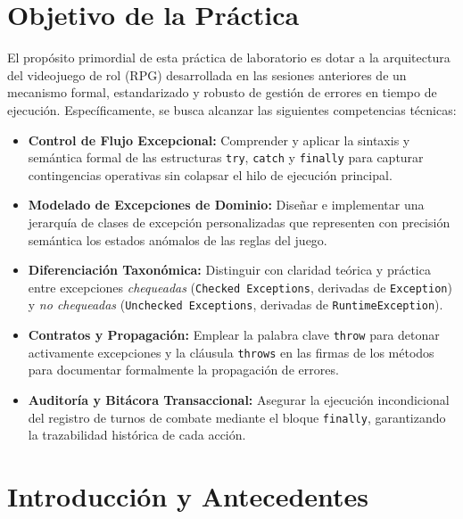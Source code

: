 \documentclass[11pt,letterpaper]{article}
\begin{document}
\section{Objetivo de la Práctica}

El propósito primordial de esta práctica de laboratorio es dotar a la arquitectura del videojuego de rol (RPG) desarrollada en las sesiones anteriores de un mecanismo formal, estandarizado y robusto de gestión de errores en tiempo de ejecución. Específicamente, se busca alcanzar las siguientes competencias técnicas:

\begin{itemize}
    \item \textbf{Control de Flujo Excepcional:} Comprender y aplicar la sintaxis y semántica formal de las estructuras \texttt{try}, \texttt{catch} y \texttt{finally} para capturar contingencias operativas sin colapsar el hilo de ejecución principal.
    \item \textbf{Modelado de Excepciones de Dominio:} Diseñar e implementar una jerarquía de clases de excepción personalizadas que representen con precisión semántica los estados anómalos de las reglas del juego.
    \item \textbf{Diferenciación Taxonómica:} Distinguir con claridad teórica y práctica entre excepciones \textit{chequeadas} (\texttt{Checked Exceptions}, derivadas de \texttt{Exception}) y \textit{no chequeadas} (\texttt{Unchecked Exceptions}, derivadas de \texttt{RuntimeException}).
    \item \textbf{Contratos y Propagación:} Emplear la palabra clave \texttt{throw} para detonar activamente excepciones y la cláusula \texttt{throws} en las firmas de los métodos para documentar formalmente la propagación de errores.
    \item \textbf{Auditoría y Bitácora Transaccional:} Asegurar la ejecución incondicional del registro de turnos de combate mediante el bloque \texttt{finally}, garantizando la trazabilidad histórica de cada acción.
\end{itemize}

\section{Introducción y Antecedentes}
\end{document}

